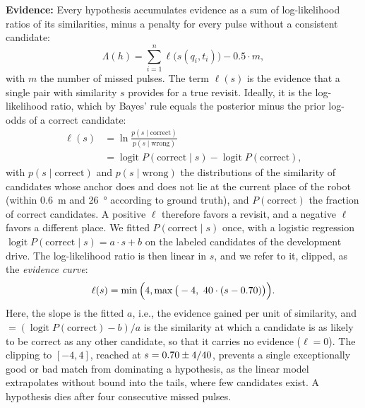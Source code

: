 \textbf{Evidence:} Every hypothesis accumulates evidence as a sum of log-likelihood ratios of its similarities, minus a penalty for every pulse without a consistent candidate:
\begin{equation}
\Lambda(h) = \sum_{i=1}^{n} \ell\big(s(q_i, t_i)\big) - 0.5 \cdot m,
\label{eq:evidence}
\end{equation}
%
with $m$ the number of missed pulses. The term $\ell(s)$ is the evidence that a single pair with similarity $s$ provides for a true revisit. Ideally, it is the log-likelihood ratio, which by Bayes' rule equals the posterior minus the prior log-odds of a correct candidate:
\begin{equation}
\begin{aligned}
\ell(s) &= \ln \frac{p(s \mid \text{correct})}{p(s \mid \text{wrong})} \\
&= \operatorname{logit} P(\text{correct} \mid s) - \operatorname{logit} P(\text{correct}),
\end{aligned}
\label{eq:llr}
\end{equation}
%
with $p(s \mid \text{correct})$ and $p(s \mid \text{wrong})$ the distributions of the similarity of candidates whose anchor does and does not lie at the current place of the robot (within \SI{0.6}{\meter} and \SI{26}{\degree} according to ground truth), and $P(\text{correct})$ the fraction of correct candidates. A positive $\ell$ therefore favors a revisit, and a negative $\ell$ favors a different place. We fitted $P(\text{correct} \mid s)$ once, with a logistic regression $\operatorname{logit} P(\text{correct} \mid s) = a \cdot s + b$ on the labeled candidates of the development drive. The log-likelihood ratio is then linear in $s$, and we refer to it, clipped, as the \emph{evidence curve}:
\begin{equation}
\ell(s) = \min\Big(4, \max\big(-4,\ 40 \cdot (s - 0.70)\big)\Big).
\label{eq:evidenceCurve}
\end{equation}
%
Here, the slope \LLRslope{} is the fitted $a$, i.e., the evidence gained per unit of similarity, and \LLRmid{} $= (\operatorname{logit} P(\text{correct}) - b)/a$ is the similarity at which a candidate is as likely to be correct as any other candidate, so that it carries no evidence ($\ell = 0$). The clipping to $[-4, 4]$, reached at $s = 0.70 \pm 4/40$, prevents a single exceptionally good or bad match from dominating a hypothesis, as the linear model extrapolates without bound into the tails, where few candidates exist. A hypothesis dies after four consecutive missed pulses.

